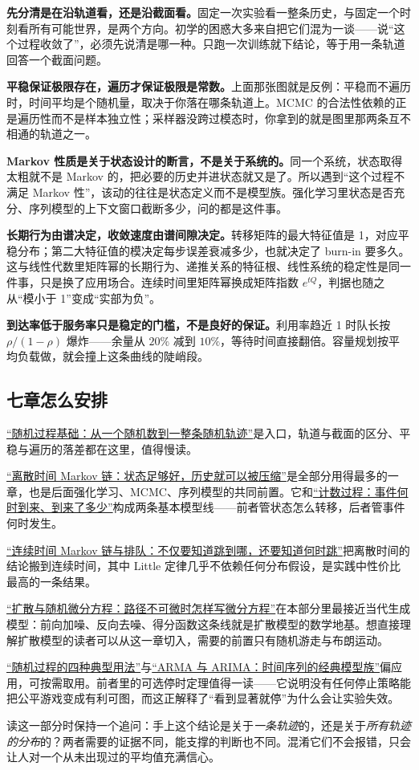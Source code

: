 \textbf{先分清是在沿轨道看，还是沿截面看。}固定一次实验看一整条历史，与固定一个时刻看所有可能世界，是两个方向。初学的困惑大多来自把它们混为一谈——说``这个过程收敛了''，必须先说清是哪一种。只跑一次训练就下结论，等于用一条轨道回答一个截面问题。

\textbf{平稳保证极限存在，遍历才保证极限是常数。}上面那张图就是反例：平稳而不遍历时，时间平均是个随机量，取决于你落在哪条轨道上。MCMC 的合法性依赖的正是遍历性而不是样本独立性；采样器没跨过模态时，你拿到的就是图里那两条互不相通的轨道之一。

\textbf{Markov 性质是关于状态设计的断言，不是关于系统的。}同一个系统，状态取得太粗就不是 Markov 的，把必要的历史并进状态就又是了。所以遇到``这个过程不满足 Markov 性''，该动的往往是状态定义而不是模型族。强化学习里状态是否充分、序列模型的上下文窗口截断多少，问的都是这件事。

\textbf{长期行为由谱决定，收敛速度由谱间隙决定。}转移矩阵的最大特征值是 1，对应平稳分布；第二大特征值的模决定每步误差衰减多少，也就决定了 burn-in 要多久。这与线性代数里矩阵幂的长期行为、递推关系的特征根、线性系统的稳定性是同一件事，只是换了应用场合。连续时间里矩阵幂换成矩阵指数 \(e^{tQ}\)，判据也随之从``模小于 1''变成``实部为负''。

\textbf{到达率低于服务率只是稳定的门槛，不是良好的保证。}利用率趋近 1 时队长按 \(\rho/(1-\rho)\) 爆炸——余量从 \(20\%\) 减到 \(10\%\)，等待时间直接翻倍。容量规划按平均负载做，就会撞上这条曲线的陡峭段。

\subsection{七章怎么安排}

\hyperref[ch:046]{``随机过程基础：从一个随机数到一整条随机轨迹''}是入口，轨道与截面的区分、平稳与遍历的落差都在这里，值得慢读。

\hyperref[ch:048]{``离散时间 Markov 链：状态足够好，历史就可以被压缩''}是全部分用得最多的一章，也是后面强化学习、MCMC、序列模型的共同前置。它和\hyperref[ch:047]{``计数过程：事件何时到来、到来了多少''}构成两条基本模型线——前者管状态怎么转移，后者管事件何时发生。

\hyperref[ch:050]{``连续时间 Markov 链与排队：不仅要知道跳到哪，还要知道何时跳''}把离散时间的结论搬到连续时间，其中 Little 定律几乎不依赖任何分布假设，是实践中性价比最高的一条结果。

\hyperref[ch:051]{``扩散与随机微分方程：路径不可微时怎样写微分方程''}在本部分里最接近当代生成模型：前向加噪、反向去噪、得分函数这条线就是扩散模型的数学地基。想直接理解扩散模型的读者可以从这一章切入，需要的前置只有随机游走与布朗运动。

\hyperref[ch:049]{``随机过程的四种典型用法''}与\hyperref[ch:052]{``ARMA 与 ARIMA：时间序列的经典模型族''}偏应用，可按需取用。前者里的可选停时定理值得一读——它说明没有任何停止策略能把公平游戏变成有利可图，而这正解释了``看到显著就停''为什么会让实验失效。

读这一部分时保持一个追问：手上这个结论是关于\emph{一条轨迹}的，还是关于\emph{所有轨迹的分布}的？两者需要的证据不同，能支撑的判断也不同。混淆它们不会报错，只会让人对一个从未出现过的平均值充满信心。
